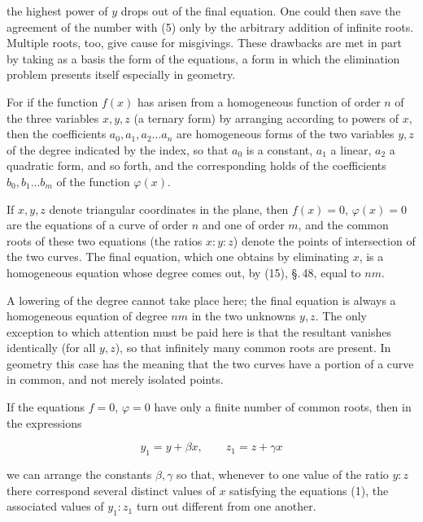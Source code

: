 the highest power of $y$ drops out of the final equation. One
could then save the agreement of the number with (5) only by
the arbitrary addition of infinite roots. Multiple roots, too, give
cause for misgivings. These drawbacks are met in part by taking
as a basis the  form of the equations, a form in
which the elimination problem presents itself especially in
geometry.

For if the function $f(x)$ has arisen from a homogeneous
function of order $n$ of the three variables $x, y, z$ (a ternary
form) by arranging according to powers of $x$, then the
coefficients $a_0, a_1, a_2 \ldots a_n$ are homogeneous forms of the
two variables $y, z$ of the degree indicated by the index, so
that $a_0$ is a constant, $a_1$ a linear, $a_2$ a quadratic form,
and so forth, and the corresponding holds of the coefficients
$b_0, b_1 \ldots b_m$ of the function $\varphi(x)$.

If $x, y, z$ denote triangular coordinates in the plane, then
$f(x) = 0$, $\varphi(x) = 0$ are the equations of a curve of order $n$ and
one of order $m$, and the common roots of these two
equations (the ratios $x:y:z$) denote the points of intersection
of the two curves. The final equation, which one obtains by
eliminating $x$, is a homogeneous equation whose degree
comes out, by (15), \S.\,48, equal to $nm$.

A lowering of the degree cannot take place here; the
final equation is always a homogeneous equation of degree $nm$
in the two unknowns $y, z$. The only exception to which
attention must be paid here is that the resultant vanishes
identically (for all $y, z$), so that infinitely many common
roots are present. In geometry this case has the meaning
that the two curves have a portion of a curve in common, and
not merely isolated points.

If the equations $f = 0$, $\varphi = 0$ have only a finite
number of common roots, then in the expressions

\[
y_1 = y + \beta x, \qquad z_1 = z + \gamma x
\]

we can arrange the constants $\beta, \gamma$ so that, whenever to one value
of the ratio $y : z$ there correspond several distinct values of $x$
satisfying the equations (1), the associated values
of $y_1 : z_1$ turn out different from one another.
